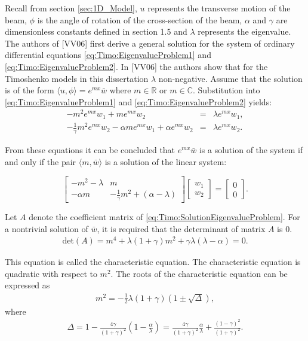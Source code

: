 \documentclass[../../main.tex]{subfiles}
\begin{document}
Recall from section \ref{sec:1D_Model}, $u$ represents the transverse motion of the beam, $\phi$ is the angle of rotation of the cross-section of the beam, $\alpha$ and $\gamma$ are dimensionless constants defined in section 1.5 and $\lambda$ represents the eigenvalue. \\

The authors of [VV06] first derive a general solution for the system of ordinary differential equations \eqref{eq:Timo:EigenvalueProblem1} and \eqref{eq:Timo:EigenvalueProblem2}. In [VV06] the authors show that for the Timoshenko models in this dissertation $\lambda$ non-negative. Assume that the solution is of the form $\langle u, \phi \rangle = e^{mx}\bar{w}$ where $m\in \mathbb{R}$ or $m\in \mathbb{C}$. Substitution into \eqref{eq:Timo:EigenvalueProblem1} and \eqref{eq:Timo:EigenvalueProblem2} yields:
\begin{eqnarray*}
-m^{2}e^{mx}w_{1}+me^{mx}w_{2}&=&\lambda e^{mx}w_{1},\\
-\frac{1}{\gamma}m^{2}e^{mx}w_{2}-\alpha me^{mx}w_{1}+\alpha e^{mx}w_{2}&=&\lambda e^{mx}w_{2}.
\end{eqnarray*}


From these equations it can be concluded that $e^{mx}\bar{w}$ is a solution of the system if and only if the pair $\langle m,\bar{w} \rangle$ is a solution of the linear system:

\begin{equation}
\begin{bmatrix}
-m^{2}-\lambda & m\\
-\alpha m & -\frac{1}{\gamma}m^{2}+(\alpha- \lambda)
\end{bmatrix}
\begin{bmatrix}
w_{1}\\w_{2}
\end{bmatrix}
=
\begin{bmatrix}
0\\0
\end{bmatrix}. \label{eq:Timo:SolutionEigenvalueProblem}
\end{equation}

Let $A$ denote the coefficient matrix of \eqref{eq:Timo:SolutionEigenvalueProblem}. For a nontrivial solution of $\bar{w}$, it is required that the determinant of matrix $A$ is $0$.
\begin{align*}
\textrm{det}(A)=m^{4}+\lambda(1+\gamma)m^{2}+\gamma\lambda(\lambda-\alpha)=0. \label{TE7}
\end{align*}

This equation is called the characteristic equation. The characteristic equation is quadratic with respect to $m^2$. The roots of the characteristic equation can be expressed as
\begin{align}
m^{2}=-\frac{1}{2}\lambda(1+\gamma)(1\pm\sqrt{\Delta}),
\end{align}
where
\begin{align}
\Delta=1-\frac{4\gamma}{(1+\gamma)^{2}}\left(1-\frac{\alpha}{\lambda}\right)=\frac{4\gamma}{(1+\gamma)^{2}}\frac{\alpha}{\lambda}+\frac{(1-\gamma)^{2}}{(1+\gamma)^{2}}.
\end{align}
\end{document}
